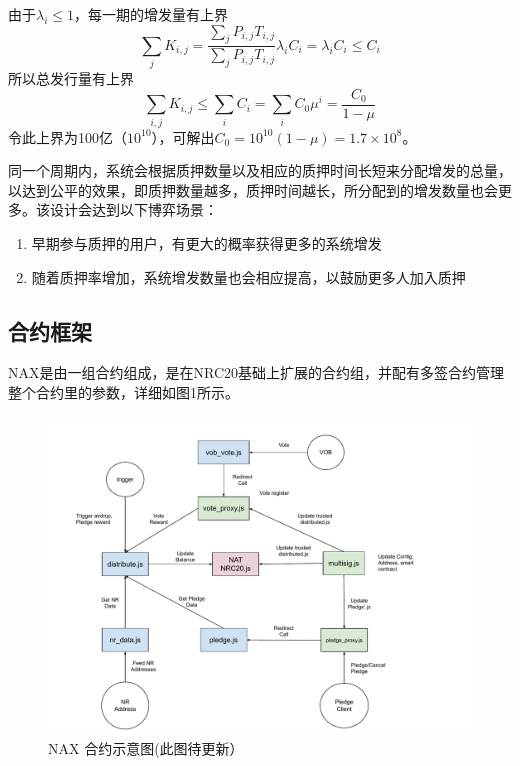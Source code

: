 由于\(\lambda_i \le 1\)，每一期的增发量有上界
\begin{equation}
  \sum_j K_{i,j} = \frac{\sum_j P_{i,j} T_{i,j}}{\sum_j P_{i,j} T_{i,j}} \lambda_i C_i = \lambda_i C_i \le C_i
\end{equation}
所以总发行量有上界
\begin{equation}
  \sum_{i,j} K_{i,j} \le \sum_i C_i = \sum_i C_0 \mu^i = \frac{C_0}{1-\mu}
\end{equation}
令此上界为100亿（\(10^{10}\)），可解出\(C_0 = 10^{10}(1-\mu) = 1.7\times10^8\)。


同一个周期内，系统会根据质押数量以及相应的质押时间长短来分配增发的总量，以达到公平的效果，即质押数量越多，质押时间越长，所分配到的增发数量也会更多。该设计会达到以下博弈场景：
\begin{enumerate}
  \item 早期参与质押的用户，有更大的概率获得更多的系统增发
  \item 随着质押率增加，系统增发数量也会相应提高，以鼓励更多人加入质押
\end{enumerate}

\subsection{合约框架}
NAX是由一组合约组成，是在NRC20基础上扩展的合约组，并配有多签合约管理整个合约里的参数，详细如图1所示。

\begin{figure}[htbp]
  \centering
    \includegraphics[width=1\textwidth]{../common/ch/nax.pdf}
    \caption{NAX 合约示意图(此图待更新） \label{fig:nax_framework}}
\end{figure}
